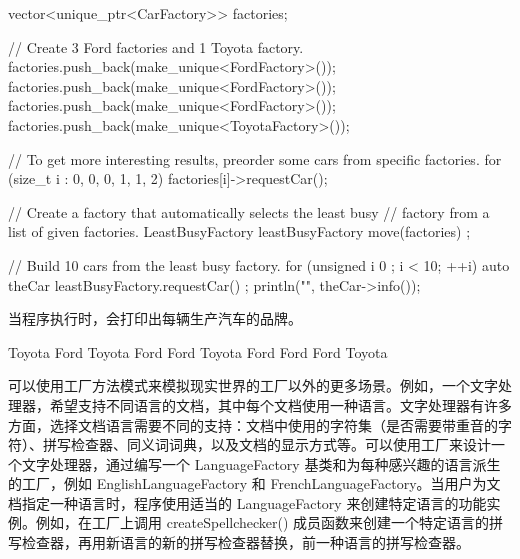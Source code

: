 \begin{cpp}
vector<unique_ptr<CarFactory>> factories;

// Create 3 Ford factories and 1 Toyota factory.
factories.push_back(make_unique<FordFactory>());
factories.push_back(make_unique<FordFactory>());
factories.push_back(make_unique<FordFactory>());
factories.push_back(make_unique<ToyotaFactory>());

// To get more interesting results, preorder some cars from specific factories.
for (size_t i : {0, 0, 0, 1, 1, 2}) { factories[i]->requestCar(); }

// Create a factory that automatically selects the least busy
// factory from a list of given factories.
LeastBusyFactory leastBusyFactory { move(factories) };

// Build 10 cars from the least busy factory.
for (unsigned i { 0 }; i < 10; ++i) {
    auto theCar { leastBusyFactory.requestCar() };
    println("{}", theCar->info());
}
\end{cpp}

当程序执行时，会打印出每辆生产汽车的品牌。

\begin{shell}
Toyota
Ford
Toyota
Ford
Ford
Toyota
Ford
Ford
Ford
Toyota
\end{shell}


可以使用工厂方法模式来模拟现实世界的工厂以外的更多场景。例如，一个文字处理器，希望支持不同语言的文档，其中每个文档使用一种语言。文字处理器有许多方面，选择文档语言需要不同的支持：文档中使用的字符集（是否需要带重音的字符）、拼写检查器、同义词词典，以及文档的显示方式等。可以使用工厂来设计一个文字处理器，通过编写一个 LanguageFactory 基类和为每种感兴趣的语言派生的工厂，例如 EnglishLanguageFactory 和 FrenchLanguageFactory。当用户为文档指定一种语言时，程序使用适当的 LanguageFactory 来创建特定语言的功能实例。例如，在工厂上调用 createSpellchecker() 成员函数来创建一个特定语言的拼写检查器，再用新语言的新的拼写检查器替换，前一种语言的拼写检查器。







